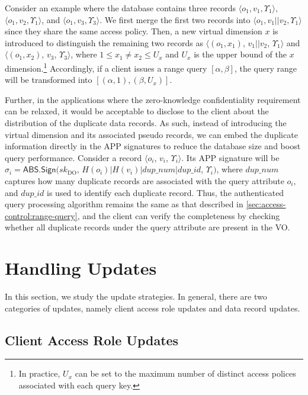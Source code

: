 Consider an example where the database contains three records $\langle o_1, v_1, \Upsilon_1\rangle$, $\langle o_1, v_2, \Upsilon_1\rangle$, and $\langle o_1, v_3, \Upsilon_3\rangle$. We first merge the first two records into $\langle o_1, v_1 || v_2, \Upsilon_1\rangle$ since they share the same access policy. Then, a new virtual dimension $x$ is introduced to distinguish the remaining two records as $\langle (o_1, x_1)$, $v_1 || v_2$, $\Upsilon_1\rangle$ and $\langle (o_1, x_2)$, $v_3$, $\Upsilon_3\rangle$, where $1 \leq x_1 \neq x_2 \leq U_x$ and $U_x$ is the upper bound of the $x$ dimension.\footnote{In practice, $U_x$ can be set to the maximum number of distinct access polices associated with each query key.} Accordingly, if a client issues a range query $[\alpha, \beta]$, the query range will be transformed into $[(\alpha, 1), (\beta, U_x)]$.

Further, in the applications where the zero-knowledge confidentiality requirement can be relaxed, it would be acceptable to disclose to the client about the distribution of the duplicate data records. As such, instead of introducing the virtual dimension and its associated pseudo records, we can embed the duplicate information directly in the APP signatures to reduce the database size and boost query performance. Consider a record $\langle o_i$, $v_i$, $\Upsilon_i\rangle$. Its APP signature will be $\sigma_i = \textsf{ABS.Sign}({sk}_{\textrm{DO}}$, $H(o_i) | H(v_i) | dup\_num | dup\_id $, $\Upsilon_i)$, where $dup\_num$ captures how many duplicate records are associated with the query attribute $o_i$, and $dup\_id$ is used to identify each duplicate record. Thus, the authenticated query processing algorithm remains the same as that described in \cref{sec:access-control:range-query}, and the client can verify the completeness by checking whether all duplicate records under the query attribute are present in the VO\@.

\section{Handling Updates}\label{sec:access-control:update}

In this section, we study the update strategies. In general, there are two categories of updates, namely client access role updates and data record updates.

\subsection{Client Access Role Updates}


